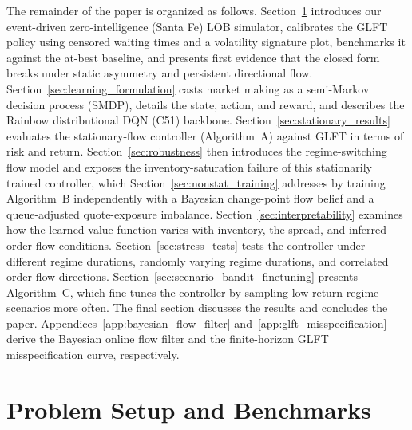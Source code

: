 \documentclass[11pt,a4paper]{article}
\begin{document}
The remainder of the paper is organized as follows.
Section~\ref{sec:problem_setup} introduces our event-driven
zero-intelligence (Santa Fe) LOB simulator, calibrates the GLFT policy
using censored waiting times and a volatility signature
plot, benchmarks it against the at-best baseline, and presents first
evidence that the closed form breaks under static asymmetry and
persistent directional flow.  Section~\ref{sec:learning_formulation}
casts market making as a semi-Markov decision process (SMDP),
details the state, action, and reward, and describes the Rainbow
distributional DQN (C51) backbone.
Section~\ref{sec:stationary_results} evaluates the stationary-flow
controller (Algorithm~A) against GLFT in terms of risk and return.
Section~\ref{sec:robustness} then introduces the regime-switching flow
model and exposes the inventory-saturation failure of this
stationarily trained controller, which
Section~\ref{sec:nonstat_training} addresses by training Algorithm~B
independently with a Bayesian change-point flow belief and a
queue-adjusted quote-exposure imbalance.
Section~\ref{sec:interpretability} examines how the learned value
function varies with inventory, the spread, and inferred order-flow
conditions.
Section~\ref{sec:stress_tests} tests the controller under different
regime durations, randomly varying regime durations, and correlated
order-flow directions.
Section~\ref{sec:scenario_bandit_finetuning} presents Algorithm~C,
which fine-tunes the controller by sampling low-return regime scenarios
more often. The final section discusses the results and concludes the
paper. Appendices~\ref{app:bayesian_flow_filter}
and~\ref{app:glft_misspecification} derive the Bayesian online flow
filter and the finite-horizon GLFT misspecification curve, respectively.


\section{Problem Setup and Benchmarks}
\label{sec:problem_setup}
\end{document}
